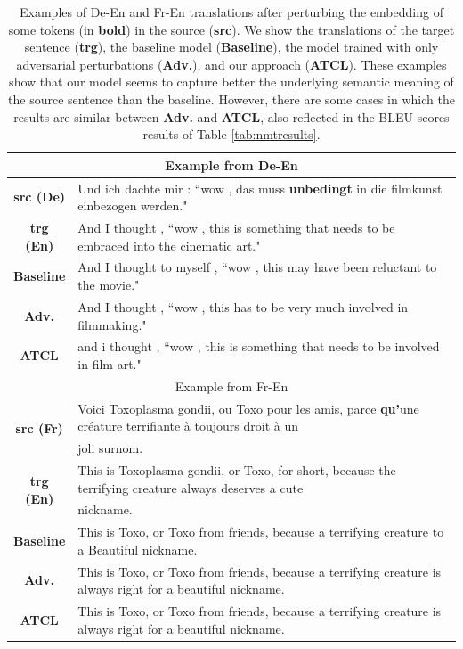 \documentclass[letterpaper]{article} %
\begin{document}
\begin{table}[ht]
\begin{center}
\begin{tabular}{|c|l|}
\hline
\multicolumn{2}{|c|}{Example from De-En}\\
\hline
\textbf{src (De)} & Und ich dachte mir : ``wow , das muss \textbf{unbedingt} in die filmkunst einbezogen werden." \\ 
\hline
\textbf{trg (En)} & And I thought , ``wow , this is something that needs to be embraced into the cinematic art." \\ \hline
\textbf{Baseline}  & And I thought to myself , ``wow , this may have been reluctant to the movie." \\ 
\hline
\textbf{Adv.} & And I thought , ``wow , this has to be very much involved in filmmaking." \\ 
\hline 
\textbf{ATCL} & and i thought , ``wow , this is something that needs to be involved in film art." \\ 
\hline \hline
\multicolumn{2}{|c|}{Example from Fr-En}\\
\hline
\multirow{2}{*}{\textbf{src (Fr)}} & Voici Toxoplasma gondii, ou Toxo pour les amis, parce \textbf{qu’}une créature terrifiante à toujours droit  à un \\ 
& joli surnom.  \\
\hline
\multirow{2}{*}{\textbf{trg (En)}} & This is Toxoplasma gondii, or Toxo, for short, because the terrifying creature always deserves a cute \\
& nickname. \\ 
\hline
\textbf{Baseline}  &  This is Toxo, or Toxo from friends, because a terrifying creature to a Beautiful nickname.\\ 
\hline
\textbf{Adv.} & This is Toxo, or Toxo from friends, because a terrifying creature is always right for a beautiful nickname. \\ 
\hline 
\textbf{ATCL} & This is Toxo, or Toxo from friends, because a terrifying creature is always right for a beautiful nickname. \\ 
\hline
\end{tabular}
	\caption{Examples of De-En and Fr-En translations after perturbing the embedding of some tokens (in \textbf{bold}) in the source (\textbf{src}). We show the translations of the target sentence (\textbf{trg}), the baseline model (\textbf{Baseline}), the model trained with only adversarial perturbations (\textbf{Adv.}), and our approach (\textbf{ATCL}). These examples show that our model seems to capture better the underlying semantic meaning of the source sentence than the baseline. However, there are some cases in which the results are similar between \textbf{Adv.} and \textbf{ATCL}, also reflected in the BLEU scores results of Table \ref{tab:nmtresults}.}
    \label{tab:nmttrans}
\end{center}
\end{table}
\end{document}
